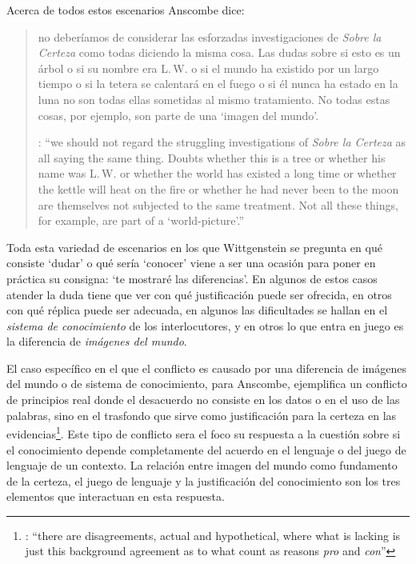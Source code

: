 Acerca de todos estos escenarios Anscombe dice: \blockquote[{\cite[130]{anscombe1981parmenides:qli}}: \enquote{we should not regard the struggling investigations of \emph{Sobre la Certeza} as all saying the same thing. Doubts whether this is a tree or whether his name was L.\,W. or whether the world has existed a long time or whether the kettle will heat on the fire or whether he had never been to the moon are themselves not subjected to the same treatment. Not all these things, for example, are part of a `world-picture'.}]{no deberíamos de considerar las esforzadas investigaciones de \emph{Sobre la Certeza} como todas diciendo la misma cosa. Las dudas sobre si esto es un árbol o si su nombre era L.\,W. o si el mundo ha existido por un largo tiempo o si la tetera se calentará en el fuego o si él nunca ha estado en la luna no son todas ellas sometidas al mismo tratamiento. No todas estas cosas, por ejemplo, son parte de una `imagen del mundo'.} Toda esta variedad de escenarios en los que Wittgenstein se pregunta en qué consiste `dudar' o qué sería `conocer' viene a ser una ocasión para poner en práctica su consigna: \enquote*{te mostraré las diferencias}. En algunos de estos casos atender la duda tiene que ver con qué justificación puede ser ofrecida, en otros con qué réplica puede ser adecuada, en algunos las dificultades se hallan en el \emph{sistema de conocimiento} de los interlocutores, y en otros lo que entra en juego es la diferencia de \emph{imágenes del mundo}.

El caso específico en el que el conflicto es causado por una diferencia de imágenes del mundo o de sistema de conocimiento, para Anscombe, ejemplifica un conflicto de principios real donde el desacuerdo no consiste en los datos o en el uso de las palabras, sino en el trasfondo que sirve como justificación para la certeza en las evidencias\footnote{\cite[Cf.~][222]{teichmann2008ans}: \enquote{there are disagreements, actual and hypothetical, where what is lacking is just this background agreement as to what count as reasons \emph{pro} and \emph{con}}}. Este tipo de conflicto sera el foco su respuesta a la cuestión sobre si el conocimiento depende completamente del acuerdo en el lenguaje o del juego de lenguaje de un contexto. La relación entre imagen del mundo como fundamento de la certeza, el juego de lenguaje y la justificación del conocimiento son los tres elementos que interactuan en esta respuesta.

